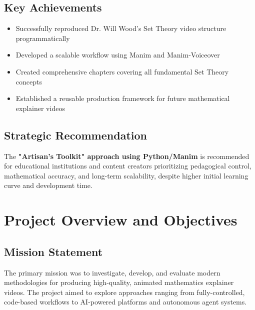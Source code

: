 \documentclass[12pt,a4paper]{article}
\begin{document}
\subsection{Key Achievements}
\begin{itemize}
    \item Successfully reproduced Dr. Will Wood's Set Theory video structure programmatically
    \item Developed a scalable workflow using Manim and Manim-Voiceover
    \item Created comprehensive chapters covering all fundamental Set Theory concepts
    \item Established a reusable production framework for future mathematical explainer videos
\end{itemize}

\subsection{Strategic Recommendation}
The \textbf{"Artisan's Toolkit" approach using Python/Manim} is recommended for educational institutions and content creators prioritizing pedagogical control, mathematical accuracy, and long-term scalability, despite higher initial learning curve and development time.

\section{Project Overview and Objectives}

\subsection{Mission Statement}
The primary mission was to investigate, develop, and evaluate modern methodologies for producing high-quality, animated mathematics explainer videos. The project aimed to explore approaches ranging from fully-controlled, code-based workflows to AI-powered platforms and autonomous agent systems.
\end{document}
